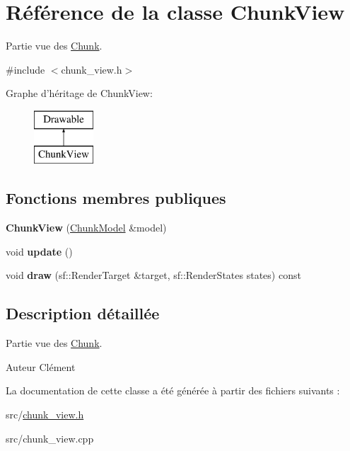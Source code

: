 \hypertarget{class_chunk_view}{\section{Référence de la classe Chunk\+View}
\label{class_chunk_view}
}


Partie vue des \hyperlink{class_chunk}{Chunk}.  




{\ttfamily \#include $<$chunk\+\_\+view.\+h$>$}

Graphe d'héritage de Chunk\+View\+:\begin{figure}[H]
\begin{center}
\leavevmode
\includegraphics[height=2.000000cm]{class_chunk_view}
\end{center}
\end{figure}
\subsection*{Fonctions membres publiques}
\begin{DoxyCompactItemize}
\item 
\hypertarget{class_chunk_view_ae3592e6619156a97402ed8640b451742}{{\bfseries Chunk\+View} (\hyperlink{class_chunk_model}{Chunk\+Model} \&model)}\label{class_chunk_view_ae3592e6619156a97402ed8640b451742}

\item 
\hypertarget{class_chunk_view_ac20eaa822207e81da05e6692fc1ff162}{void {\bfseries update} ()}\label{class_chunk_view_ac20eaa822207e81da05e6692fc1ff162}

\item 
\hypertarget{class_chunk_view_a71ad8cb7c8bfb4112515b0a8250e08d4}{void {\bfseries draw} (sf\+::\+Render\+Target \&target, sf\+::\+Render\+States states) const }\label{class_chunk_view_a71ad8cb7c8bfb4112515b0a8250e08d4}

\end{DoxyCompactItemize}


\subsection{Description détaillée}
Partie vue des \hyperlink{class_chunk}{Chunk}. 

\begin{DoxyAuthor}{Auteur}
Clément 
\end{DoxyAuthor}


La documentation de cette classe a été générée à partir des fichiers suivants \+:\begin{DoxyCompactItemize}
\item 
src/\hyperlink{chunk__view_8h}{chunk\+\_\+view.\+h}\item 
src/chunk\+\_\+view.\+cpp\end{DoxyCompactItemize}
